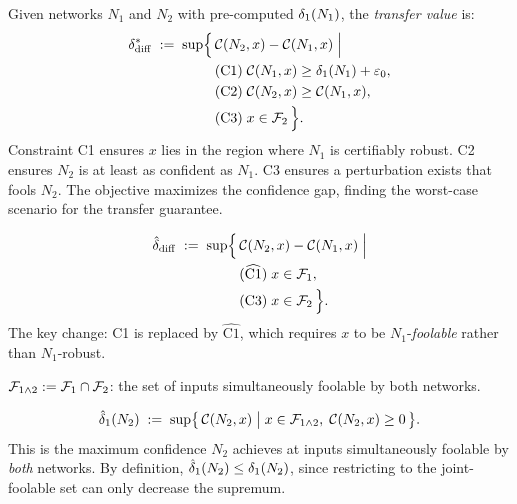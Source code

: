 \begin{definition}
  \label{def:ddiff}
  Given networks $N_1$ and $N_2$ with pre-computed $\delta_1(N_{1})$, the \emph{transfer value} is:
  \begin{align}
    \delta_{\mathrm{diff}}^{*}
    \;:=\;\sup\Bigl\{\,
      &\mathcal{C}(N_2,x)-\mathcal{C}(N_1,x)
      \;\Big|\notag\\
      &(\mathrm{C1})\;\mathcal{C}(N_1,x)\geq\delta_1(N_{1})+\varepsilon_0,\notag\\
      &(\mathrm{C2})\;\mathcal{C}(N_2,x)\geq\mathcal{C}(N_1,x),\notag\\
      &(\mathrm{C3})\;x\in\mathcal{F}_{2}
    \,\Bigr\}.\label{eq:ddiff}
  \end{align}
  Constraint C1 ensures $x$ lies in the region where $N_1$ is certifiably robust. C2 ensures $N_2$ is at least as confident as $N_1$. C3 ensures a perturbation exists that fools $N_2$. The objective maximizes the confidence gap, finding the worst-case scenario for the transfer guarantee.
\end{definition}

\begin{definition}
  \label{def:ddiffmod}
  \begin{align}
    \hat{\delta}_{\mathrm{diff}}
    \;:=\;\sup\Bigl\{\,
      &\mathcal{C}(N_2,x)-\mathcal{C}(N_1,x)
      \;\Big|\notag\\
      &(\widehat{\mathrm{C1}})\;x\in\mathcal{F}_{1},\notag\\
      &(\mathrm{C3})\;x\in\mathcal{F}_{2}
    \,\Bigr\}.\label{eq:ddiffmod}
  \end{align}
  The key change: C1 is replaced by $\widehat{\mathrm{C1}}$, which requires $x$ to be $N_1$-\emph{foolable} rather than $N_1$-robust.
\end{definition}

\begin{definition}
  \label{def:joint}
  $\mathcal{F}_{1\wedge 2} := \mathcal{F}_{1}\cap\mathcal{F}_{2}$: the set of inputs simultaneously foolable by both networks.
\end{definition}

\begin{definition}
  \label{def:delta1mod}
  \[
    \hat{\delta}_1(N_{2}) \;:=\;
    \sup\bigl\{\,\mathcal{C}(N_2,x)
      \;\big|\;
      x\in\mathcal{F}_{1\wedge 2},\;
      \mathcal{C}(N_2,x)\geq 0
    \,\bigr\}.
  \]
  This is the maximum confidence $N_2$ achieves at inputs simultaneously foolable by \emph{both} networks. By definition, $\hat{\delta}_1(N_{2}) \leq \delta_1(N_{2})$, since restricting to the joint-foolable set can only decrease the supremum.
\end{definition}
